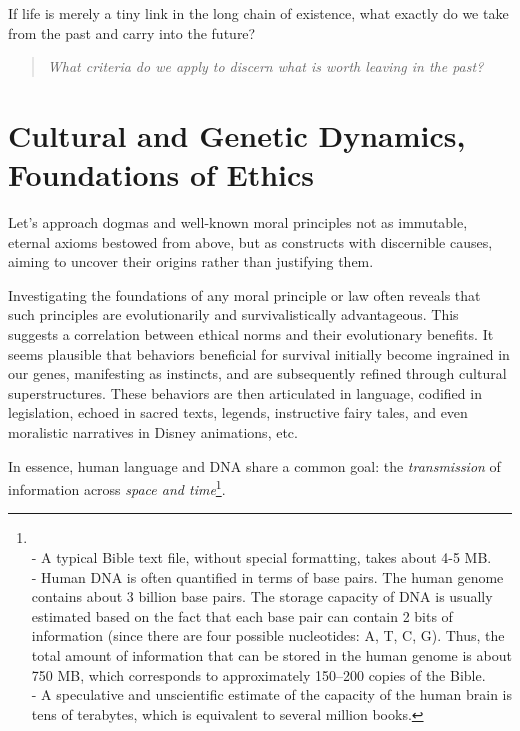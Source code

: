 \documentclass[11pt,a4]{article}
\begin{document}
    \par
    If life is merely a tiny link in the long chain of
    existence, what exactly do we take from the past
    and carry into the future?
    \begin{quote}
        \textit{What criteria
        do we apply to discern what is worth leaving in the past?}
    \end{quote}



\newpage


\section{Cultural and Genetic Dynamics, Foundations of Ethics}

    Let's approach dogmas and well-known moral principles not as
    immutable, eternal axioms bestowed from above, but as constructs
    with discernible causes, aiming to uncover their origins rather than
    justifying them.
    \par
    Investigating the foundations of any moral principle or law often
    reveals that such principles are evolutionarily and survivalistically
    advantageous. This suggests a correlation between ethical
    norms and their evolutionary benefits. It seems plausible
    that behaviors beneficial for
    survival initially become ingrained in our genes, manifesting as
    instincts, and are subsequently refined through cultural superstructures.
    These behaviors are then articulated in language,
    codified in legislation, echoed in sacred texts, legends,
    instructive fairy tales, and even moralistic narratives in
    Disney animations, etc.

    \par
    In essence, human language and DNA share a common goal: the \textit{transmission} of
    information across \textit{space and time}\footnote{\\- A typical Bible text file,
    without special formatting, takes about 4-5 MB. \\
    - Human DNA is often quantified in terms of base pairs.
    The human genome contains about 3 billion base pairs.
    The storage capacity of DNA is usually estimated based on the
    fact that each base pair can contain
    2 bits of information (since there are four possible nucleotides: A, T, C, G).
    Thus, the total amount of information that can be stored in the human
    genome is about 750 MB, which corresponds to approximately 150–200 copies of
    the Bible.\\
    - A speculative and unscientific estimate of the capacity
    of the human brain is tens of terabytes, which is
    equivalent to several million books.}.
\end{document}
